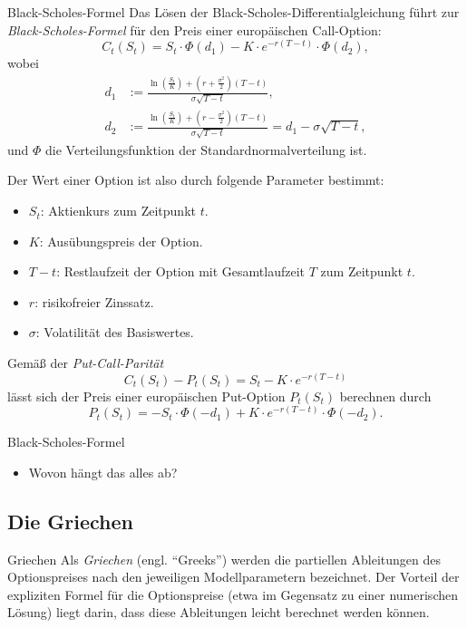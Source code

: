 \begin{defi}{Black-Scholes-Formel}
    Das Lösen der Black-Scholes-Differentialgleichung führt zur \emph{Black-Scholes-Formel} für den Preis einer europäischen Call-Option:
    \[
        C_t(S_t) = S_t \cdot \Phi(d_1) - K \cdot e^{-r(T-t)} \cdot \Phi(d_2),
    \]
    wobei
    \[
        \begin{aligned}
            d_1 & := \frac{\ln(\frac{S_t}{K}) + (r + \frac{\sigma^2}{2})(T-t)}{\sigma \sqrt{T-t}},                            \\
            d_2 & := \frac{\ln(\frac{S_t}{K}) + (r - \frac{\sigma^2}{2})(T-t)}{\sigma \sqrt{T-t}} = d_1 - \sigma \sqrt{T-t} ,
        \end{aligned}
    \]
    und $\Phi$ die Verteilungsfunktion der Standardnormalverteilung ist.

    Der Wert einer Option ist also durch folgende Parameter bestimmt:
    \begin{itemize}
        \item $S_t$: Aktienkurs zum Zeitpunkt $t$.
        \item $K$: Ausübungspreis der Option.
        \item $T-t$: Restlaufzeit der Option mit Gesamtlaufzeit $T$ zum Zeitpunkt $t$.
        \item $r$: risikofreier Zinssatz.
        \item $\sigma$: Volatilität des Basiswertes.
    \end{itemize}

    Gemäß der \emph{Put-Call-Parität}
    \[
        C_t(S_t) - P_t(S_t) = S_t - K \cdot e^{-r(T-t)}
    \]
    lässt sich der Preis einer europäischen Put-Option $P_t(S_t)$ berechnen durch
    \[
        P_t(S_t) = - S_t \cdot \Phi(-d_1) + K \cdot e^{-r(T-t)} \cdot \Phi(-d_2).
    \]
\end{defi}

\begin{info}{Black-Scholes-Formel}
    \begin{itemize}
        \item Wovon hängt das alles ab?
    \end{itemize}
\end{info}

\subsection{Die Griechen}

\begin{defi}{Griechen}
    Als \emph{Griechen} (engl. \enquote{Greeks}) werden die partiellen Ableitungen des Optionspreises nach den jeweiligen Modellparametern bezeichnet. Der Vorteil der expliziten Formel für die Optionspreise (etwa im Gegensatz zu einer numerischen Lösung) liegt darin, dass diese Ableitungen leicht berechnet werden können.
\end{defi}

